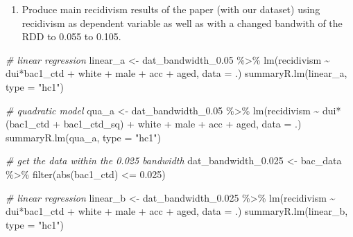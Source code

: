 \documentclass[
  11pt,
]{article}
\newenvironment{Shaded}{\begin{snugshade}}{\end{snugshade}}
\newcommand{\AttributeTok}[1]{\textcolor[rgb]{0.77,0.63,0.00}{#1}}
\newcommand{\CommentTok}[1]{\textcolor[rgb]{0.56,0.35,0.01}{\textit{#1}}}
\newcommand{\FloatTok}[1]{\textcolor[rgb]{0.00,0.00,0.81}{#1}}
\newcommand{\FunctionTok}[1]{\textcolor[rgb]{0.00,0.00,0.00}{#1}}
\newcommand{\NormalTok}[1]{#1}
\newcommand{\OtherTok}[1]{\textcolor[rgb]{0.56,0.35,0.01}{#1}}
\newcommand{\SpecialCharTok}[1]{\textcolor[rgb]{0.00,0.00,0.00}{#1}}
\newcommand{\StringTok}[1]{\textcolor[rgb]{0.31,0.60,0.02}{#1}}
\providecommand{\tightlist}{%
  \setlength{\itemsep}{0pt}\setlength{\parskip}{0pt}}
\begin{document}
\begin{enumerate}
\def\labelenumi{\arabic{enumi}.}
\setcounter{enumi}{2}
\tightlist
\item
  Produce main recidivism results of the paper (with our dataset) using
  recidivism as dependent variable as well as with a changed bandwith of
  the RDD to 0.055 to 0.105.
\end{enumerate}

\begin{Shaded}
\begin{Highlighting}[]
\CommentTok{\# linear regression}
\NormalTok{linear\_a }\OtherTok{\textless{}{-}} 
\NormalTok{  dat\_bandwidth\_0}\FloatTok{.05} \SpecialCharTok{\%\textgreater{}\%} 
  \FunctionTok{lm}\NormalTok{(recidivism }\SpecialCharTok{\textasciitilde{}}\NormalTok{ dui}\SpecialCharTok{*}\NormalTok{bac1\_ctd }\SpecialCharTok{+}\NormalTok{ white }\SpecialCharTok{+}\NormalTok{ male }\SpecialCharTok{+}\NormalTok{ acc }\SpecialCharTok{+}\NormalTok{ aged,}
     \AttributeTok{data =}\NormalTok{ .)}
\FunctionTok{summaryR.lm}\NormalTok{(linear\_a, }\AttributeTok{type =} \StringTok{"hc1"}\NormalTok{)}

\CommentTok{\# quadratic model}
\NormalTok{qua\_a }\OtherTok{\textless{}{-}} 
\NormalTok{  dat\_bandwidth\_0}\FloatTok{.05} \SpecialCharTok{\%\textgreater{}\%} 
  \FunctionTok{lm}\NormalTok{(recidivism }\SpecialCharTok{\textasciitilde{}}\NormalTok{ dui}\SpecialCharTok{*}\NormalTok{(bac1\_ctd }\SpecialCharTok{+}\NormalTok{ bac1\_ctd\_sq) }\SpecialCharTok{+}\NormalTok{ white }\SpecialCharTok{+}\NormalTok{ male }\SpecialCharTok{+}\NormalTok{ acc }\SpecialCharTok{+}\NormalTok{ aged,}
     \AttributeTok{data =}\NormalTok{ .)}
\FunctionTok{summaryR.lm}\NormalTok{(qua\_a, }\AttributeTok{type =} \StringTok{"hc1"}\NormalTok{)}


\CommentTok{\# get the data within the 0.025 bandwidth}
\NormalTok{dat\_bandwidth\_0}\FloatTok{.025} \OtherTok{\textless{}{-}}\NormalTok{ bac\_data }\SpecialCharTok{\%\textgreater{}\%} \FunctionTok{filter}\NormalTok{(}\FunctionTok{abs}\NormalTok{(bac1\_ctd) }\SpecialCharTok{\textless{}=} \FloatTok{0.025}\NormalTok{)}

\CommentTok{\# linear regression}
\NormalTok{linear\_b }\OtherTok{\textless{}{-}} 
\NormalTok{  dat\_bandwidth\_0}\FloatTok{.025} \SpecialCharTok{\%\textgreater{}\%} 
  \FunctionTok{lm}\NormalTok{(recidivism }\SpecialCharTok{\textasciitilde{}}\NormalTok{ dui}\SpecialCharTok{*}\NormalTok{bac1\_ctd }\SpecialCharTok{+}\NormalTok{ white }\SpecialCharTok{+}\NormalTok{ male }\SpecialCharTok{+}\NormalTok{ acc }\SpecialCharTok{+}\NormalTok{ aged,}
     \AttributeTok{data =}\NormalTok{ .)}
\FunctionTok{summaryR.lm}\NormalTok{(linear\_b, }\AttributeTok{type =} \StringTok{"hc1"}\NormalTok{)}


\end{Highlighting}
\end{Shaded}
\end{document}
